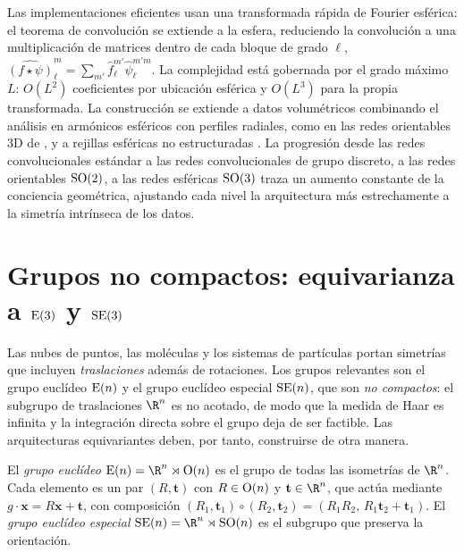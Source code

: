 Las implementaciones eficientes usan una transformada r\'apida de Fourier
esf\'erica: el teorema de convoluci\'on se extiende a la esfera, reduciendo la
convoluci\'on a una multiplicaci\'on de matrices dentro de cada bloque de grado
$\ell$, $\widehat{(f \star \psi)}_\ell^m = \sum_{m'} \hat f_\ell^{m'}
\hat\psi_\ell^{m'm}$. La complejidad est\'a gobernada por el grado m\'aximo $L$:
$O(L^2)$ coeficientes por ubicaci\'on esf\'erica y $O(L^3)$ para la propia
transformada. La construcci\'on se extiende a datos volum\'etricos combinando el
an\'alisis en arm\'onicos esf\'ericos con perfiles radiales, como en las redes
orientables 3D de \citet{weiler2018steerable}, y a rejillas esf\'ericas no
estructuradas \citep{cohen2021spherical}. La progresi\'on desde las redes
convolucionales est\'andar a las redes convolucionales de grupo discreto, a las
redes orientables $\operatorname{SO}(2)$, a las redes esf\'ericas $\operatorname{SO}(3)$ traza un aumento
constante de la conciencia geom\'etrica, ajustando cada nivel la arquitectura m\'as
estrechamente a la simetr\'ia intr\'inseca de los datos.

\section{Grupos no compactos: equivarianza a $\operatorname{E}(3)$ y $\operatorname{SE}(3)$}
\label{sec:groups:noncompact}

Las nubes de puntos, las mol\'eculas y los sistemas de part\'iculas portan
simetr\'ias que incluyen \emph{traslaciones} adem\'as de rotaciones. Los grupos
relevantes son el grupo eucl\'ideo $\operatorname{E}(n)$ y el grupo eucl\'ideo especial
$\operatorname{SE}(n)$, que son \emph{no compactos}: el subgrupo de traslaciones $\R^n$ es no
acotado, de modo que la medida de Haar es infinita y la integraci\'on directa
sobre el grupo deja de ser factible. Las arquitecturas equivariantes deben, por
tanto, construirse de otra manera.

\begin{definition}
\label{def:groups:euclidean}
El \emph{grupo eucl\'ideo} $\Eucl(n) = \R^n \rtimes \OO(n)$ es el grupo de todas
las isometr\'ias de $\R^n$. Cada elemento es un par $(R, \mathbf{t})$ con $R \in
\operatorname{O}(n)$ y $\mathbf{t} \in \R^n$, que act\'ua mediante $g \cdot \mathbf{x} =
R\mathbf{x} + \mathbf{t}$, con composici\'on $(R_1, \mathbf{t}_1)\circ(R_2,
\mathbf{t}_2) = (R_1 R_2,\, R_1 \mathbf{t}_2 + \mathbf{t}_1)$. El \emph{grupo
eucl\'ideo especial} $\SE(n) = \R^n \rtimes \SO(n)$ es el subgrupo que preserva
la orientaci\'on.
\end{definition}

